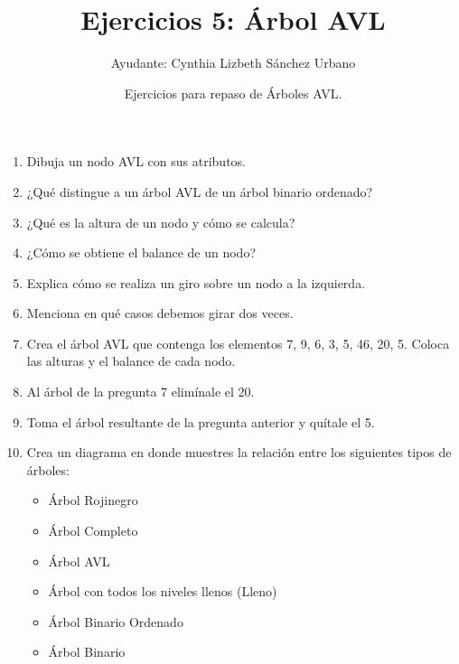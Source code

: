 \documentclass[12pt]{article} %
\begin{document}
\title{Ejercicios 5: Árbol AVL}
\author{Ayudante: Cynthia Lizbeth Sánchez Urbano}
\date{Ejercicios para repaso de Árboles AVL.}
\maketitle
\begin{enumerate}
\item Dibuja un nodo AVL con sus atributos.
\item ¿Qué distingue a un árbol AVL de un árbol binario ordenado?
\item ¿Qué es la altura de un nodo y cómo se calcula?
\item ¿Cómo se obtiene el balance de un nodo?
\item Explica cómo se realiza un giro sobre un nodo a la izquierda.
\item Menciona en qué casos debemos girar dos veces.
\item Crea el árbol AVL que contenga los elementos 7, 9, 6, 3, 5, 46, 20, 5. Coloca las alturas y el balance de cada nodo.
\item Al árbol de la pregunta 7 elimínale el 20.
\item Toma el árbol resultante de la pregunta anterior y quítale el 5.
\item Crea un diagrama en donde muestres la relación entre los siguientes tipos de árboles:
\begin{itemize}
\item Árbol Rojinegro
\item Árbol Completo
\item Árbol AVL
\item Árbol con todos los niveles llenos (Lleno)
\item Árbol Binario Ordenado
\item Árbol Binario
\end{itemize}
\end{enumerate}
\end{document}
